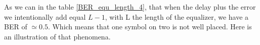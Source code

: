 \documentclass[frenchb, oneside, headings=normal]{scrartcl}
\begin{document}

As we can in the table \ref{BER_equ_length_4}, that when the delay plus the error we intentionally add equal $L-1$, with L the length of the equalizer, we have a BER of $\simeq 0.5$. Which means that one symbol on two is not well placed. Here is an illustration of that phenomena.
\end{document}
